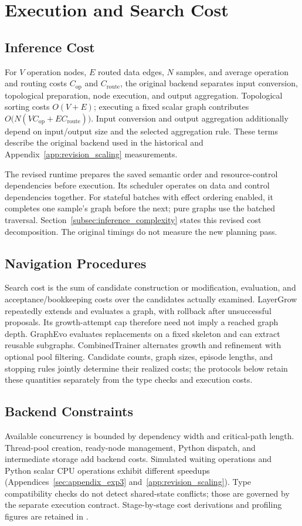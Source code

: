 \section{Execution and Search Cost}
\label{sec:complexity_analysis}
\subsection{Inference Cost}
\label{sec:single_inference}
For $V$ operation nodes, $E$ routed data edges, $N$ samples, and average operation
and routing costs $C_{\mathrm{op}}$ and $C_{\mathrm{route}}$, the original
backend separates input conversion, topological preparation, node execution,
and output aggregation. Topological sorting costs $O(V+E)$; executing a fixed
scalar graph contributes $O\bigl(N(VC_{\mathrm{op}}+EC_{\mathrm{route}})\bigr)$.
Input conversion and output aggregation additionally depend on input/output
size and the selected aggregation rule. These terms describe the original
backend used in the historical and Appendix~\ref{app:revision_scaling}
measurements.

The revised runtime prepares the saved semantic order and resource-control
dependencies before execution. Its scheduler operates on data and control
dependencies together. For stateful batches with effect ordering enabled, it
completes one sample's graph before the next; pure graphs use the batched
traversal. Section~\ref{subsec:inference_complexity} states this revised cost
decomposition. The original timings do not measure the new planning pass.

\subsection{Navigation Procedures}
\label{sec:detailed_analysis}
Search cost is the sum of candidate construction or modification, evaluation,
and acceptance/bookkeeping costs over the candidates actually examined.
LayerGrow repeatedly extends and evaluates a graph, with rollback after
unsuccessful proposals. Its growth-attempt cap therefore need not imply a
reached graph depth. GraphEvo evaluates replacements on a fixed skeleton and
can extract reusable subgraphs. CombinedTrainer alternates growth and
refinement with optional pool filtering. Candidate counts, graph sizes,
episode lengths, and stopping rules jointly determine their realized costs;
the protocols below retain these quantities separately from the type checks
and execution costs.

\subsection{Backend Constraints}
\label{sec:engineering_constraints}
Available concurrency is bounded by dependency width and critical-path length.
Thread-pool creation, ready-node management, Python dispatch, and intermediate
storage add backend costs. Simulated waiting operations and Python scalar
CPU operations exhibit different speedups (Appendices~\ref{sec:appendix_exp3}
and~\ref{app:revision_scaling}). Type compatibility checks do not detect
shared-state conflicts; those are governed by the separate execution contract.
Stage-by-stage cost derivations and profiling figures are retained in
.

